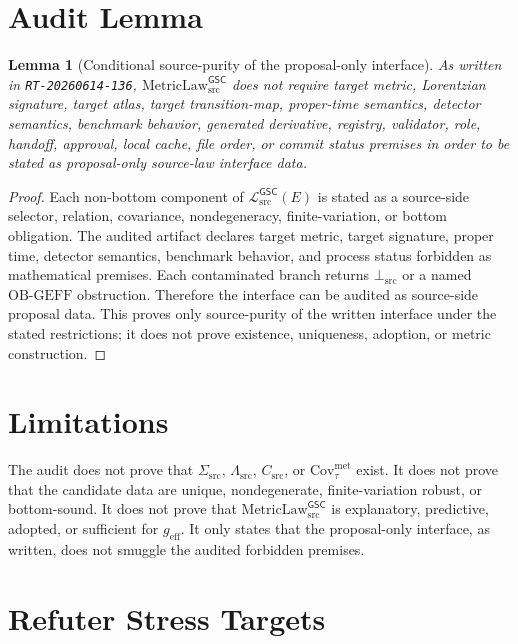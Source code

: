 \documentclass[11pt]{article}
\newcommand{\MetricLaw}{\mathrm{MetricLaw}_{\mathrm{src}}^{\mathsf{GSC}}}
\newcommand{\MetricData}{\mathcal{L}_{\mathrm{src}}^{\mathsf{GSC}}}
\newcommand{\BottomSrc}{\bot_{\mathrm{src}}}
\newcommand{\geff}{g_{\mathrm{eff}}}
\newtheorem{lemma}{Lemma}
\begin{document}
\section{Audit Lemma}

\begin{lemma}[Conditional source-purity of the proposal-only interface]
As written in \texttt{RT-20260614-136}, \(\MetricLaw\) does not require target
metric, Lorentzian signature, target atlas, target transition-map, proper-time
semantics, detector semantics, benchmark behavior, generated derivative,
registry, validator, role, handoff, approval, local cache, file order, or
commit status premises in order to be stated as proposal-only source-law
interface data.
\end{lemma}

\begin{proof}
Each non-bottom component of \(\MetricData(E)\) is stated as a source-side
selector, relation, covariance, nondegeneracy, finite-variation, or bottom
obligation. The audited artifact declares target metric, target signature,
proper time, detector semantics, benchmark behavior, and process status
forbidden as mathematical premises. Each contaminated branch returns
\(\BottomSrc\) or a named \(\mathrm{OB\mbox{-}GEFF}\) obstruction. Therefore
the interface can be audited as source-side proposal data. This proves only
source-purity of the written interface under the stated restrictions; it does
not prove existence, uniqueness, adoption, or metric construction.
\end{proof}

\section{Limitations}

The audit does not prove that \(\Sigma_{\mathrm{src}}\),
\(\Lambda_{\mathrm{src}}\), \(C_{\mathrm{src}}\), or
\(\mathrm{Cov}_{\tau}^{\mathrm{met}}\) exist. It does not prove that the
candidate data are unique, nondegenerate, finite-variation robust, or
bottom-sound. It does not prove that \(\MetricLaw\) is explanatory,
predictive, adopted, or sufficient for \(\geff\). It only states that the
proposal-only interface, as written, does not smuggle the audited forbidden
premises.

\section{Refuter Stress Targets}
\end{document}
